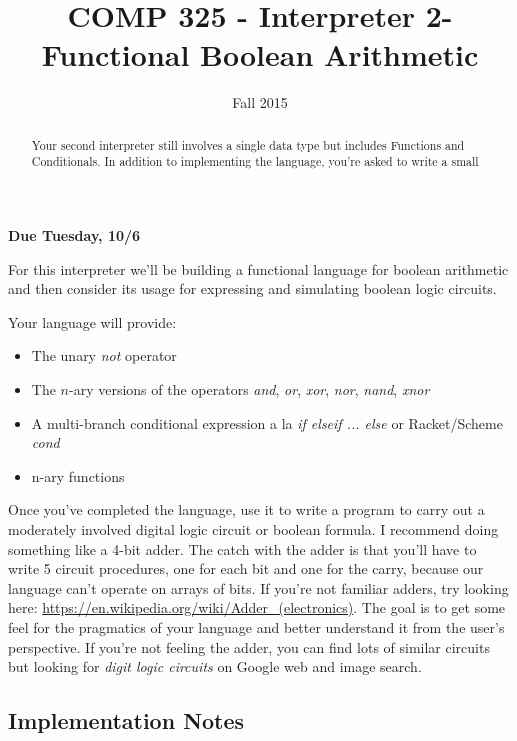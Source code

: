 \documentclass[10pt]{article}
\title{COMP 325 - Interpreter 2- Functional Boolean Arithmetic}
\author{  }
\date{Fall 2015}
\begin{document}
\maketitle

\begin{abstract}
Your second interpreter still involves a single data type but includes Functions and Conditionals.  In addition to implementing the language, you're asked to write a small 
\end{abstract}

\begin{center}
\textbf{Due Tuesday, 10/6}
\end{center}

For this interpreter we'll be building a functional language for boolean arithmetic and then consider its usage for expressing and simulating boolean logic circuits. 

Your language will provide:
\begin{itemize}
\item The unary \textit{not} operator
\item The $n$-ary versions of the operators \textit{and}, \textit{or}, \textit{xor}, \textit{nor}, \textit{nand}, \textit{xnor}
\item A multi-branch conditional expression a la \textit{if elseif ... else} or Racket/Scheme \textit{cond}
\item n-ary functions 
\end{itemize}

Once you've completed the language, use it to write a program to carry out a moderately involved digital logic circuit or boolean formula. I recommend doing something like a 4-bit adder. The catch with the adder is that you'll have to write 5 circuit procedures, one for each bit and one for the carry, because our language can't operate on arrays of bits. If you're not familiar adders, try looking here: \url{https://en.wikipedia.org/wiki/Adder_(electronics)}.  The goal is to get some feel for the pragmatics of your language and better understand it from the user's perspective.  If you're not feeling the adder, you can find lots of similar circuits but looking for \textit{digit logic circuits} on Google web and image search.

\subsection{Implementation Notes}
\end{document}
